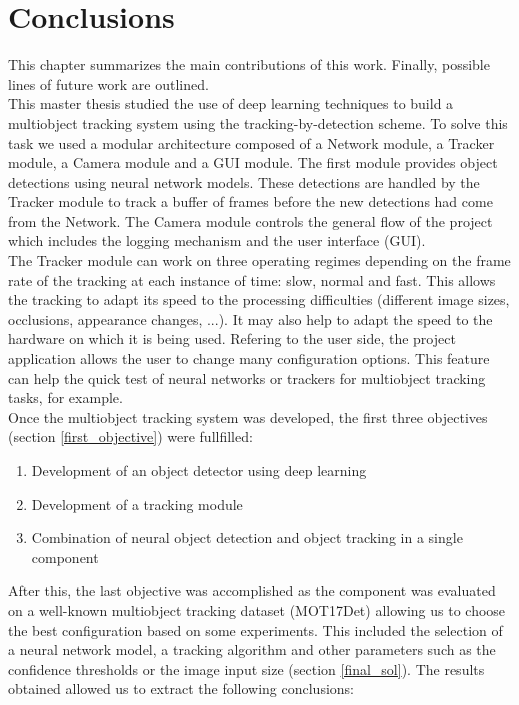 \chapter{Conclusions}
This chapter summarizes the main contributions of this work. Finally, possible lines of future work are outlined.\\
This master thesis studied the use of deep learning techniques to build a multiobject tracking system using the tracking-by-detection scheme. To solve this task we used a modular architecture composed of a Network module, a Tracker module, a Camera module and a GUI module. The first module provides object detections using neural network models. These detections are handled by the Tracker module to track a buffer of frames before the new detections had come from the Network. The Camera module controls the general flow of the project which includes the logging mechanism and the user interface (GUI).\\
The Tracker module can work on three operating regimes depending on the frame rate of the tracking at each instance of time: slow, normal and fast. This allows the tracking to adapt its speed to the processing difficulties (different image sizes, occlusions, appearance changes, ...). It may also help to adapt the speed to the hardware on which it is being used.
Refering to the user side, the project application allows the user to change many configuration options. This feature can help the quick test of neural networks or trackers for multiobject tracking tasks, for example.\\
Once the multiobject tracking system was developed, the first three objectives (section \ref{first_objective}) were fullfilled:
\begin{enumerate}
    \item Development of an object detector using deep learning
    \item Development of a tracking module
    \item Combination of neural object detection and object tracking in a single component
\end{enumerate}
After this, the last objective was accomplished as the component was evaluated on a well-known multiobject tracking dataset (MOT17Det) allowing us to choose the best configuration based on some experiments. This included the selection of a neural network model, a tracking algorithm and other parameters such as the confidence thresholds or the image input size (section \ref{final_sol}). The results obtained allowed us to extract the following conclusions:
